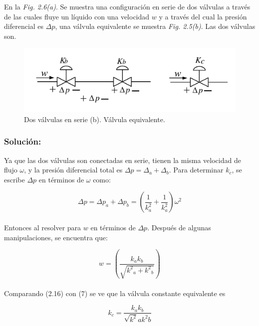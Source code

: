 \documentclass[a4paper,12pt,twoside]{proyectotanquesecci}
\begin{document}
En la \textit{Fig. 2.6(a)}. Se muestra una configuración en serie de dos válvulas a través de las cuales fluye un líquido con una velocidad $w$ y a través del cual la presión diferencial es ${\Delta p}$, una válvula equivalente se muestra \textit{Fig. 2.5(b)}. Las dos válvulas son.

\begin{figure}[h]
\centering
\includegraphics[scale=0.5]{Figura6}
\renewcommand{\figurename}{Fig.}
\caption{Dos válvulas en serie (b). Válvula equivalente.}
\label{Dos válvulas en serie (b). Válvula equivalente.}
\end{figure}

\subsubsection{Solución:}

Ya que las dos válvulas son conectadas en serie, tienen la misma velocidad de flujo $\omega$, y la presión diferencial total es $\Delta p = \Delta_{a}+\Delta_{b}$. Para determinar $k_{c}$, se escribe $\Delta p$ en términos de $\omega$ como:

\begin{equation}
\Delta p= \Delta p_{a}+\Delta p_{b} = \left(\frac{1}{k^{2}_{a}}+\frac{1}{k^{2}_{a}}\right)\omega^{2}
\end{equation} \\

Entonces al resolver para $w$ en términos de $\Delta p$. Después de algunas manipulaciones, se encuentra que:

\begin{equation}
w=\left(\frac{{k_{a}k_{b}}}{\sqrt{{k^{2}}_{a}+{k^{2}}_{b}}} \right)
\end{equation} \\

Comparando (2.16) con (7) se ve que la válvula constante equivalente es

\begin{equation}
k_{c}=\frac{k_{a} k_{b}}{\sqrt{k^{2}}a{k^{2}}b}
\end{equation}
\end{document}
